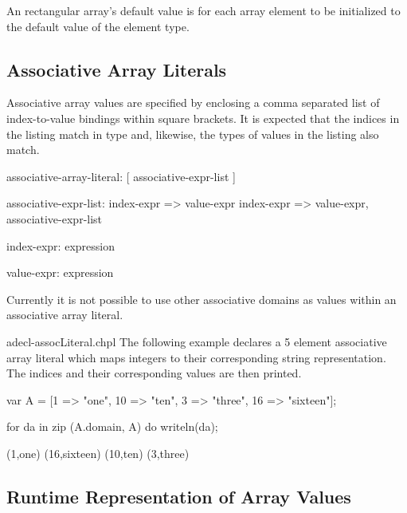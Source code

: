 An rectangular array's default value is for each array element to be initialized to
the default value of the element type.

\subsection{Associative Array Literals}

Associative array values are specified by enclosing a comma separated list of
index-to-value bindings within square brackets. It is expected that the indices 
in the listing match in type and, likewise, the types of values in the listing 
also match. 

\begin{syntax}
associative-array-literal:
  [ associative-expr-list ]

associative-expr-list:
  index-expr => value-expr
  index-expr => value-expr, associative-expr-list

index-expr:
  expression

value-expr:
  expression
\end{syntax}

\begin{openissue}
Currently it is not possible to use other associative domains as values within
an associative array literal.
\end{openissue}

\begin{chapelexample}{adecl-assocLiteral.chpl}
The following example declares a 5 element associative array literal which maps
integers to their corresponding string representation. The indices and their
corresponding values are then printed. 
\begin{chapel}
var A = [1 => "one", 10 => "ten", 3 => "three", 16 => "sixteen"];

for da in zip (A.domain, A) do
  writeln(da);
\end{chapel}
\begin{chapeloutput}
(1,one)
(16,sixteen)
(10,ten)
(3,three)
\end{chapeloutput}
\end{chapelexample}

\subsection{Runtime Representation of Array Values}
\label{Array_Runtime_Representation}

